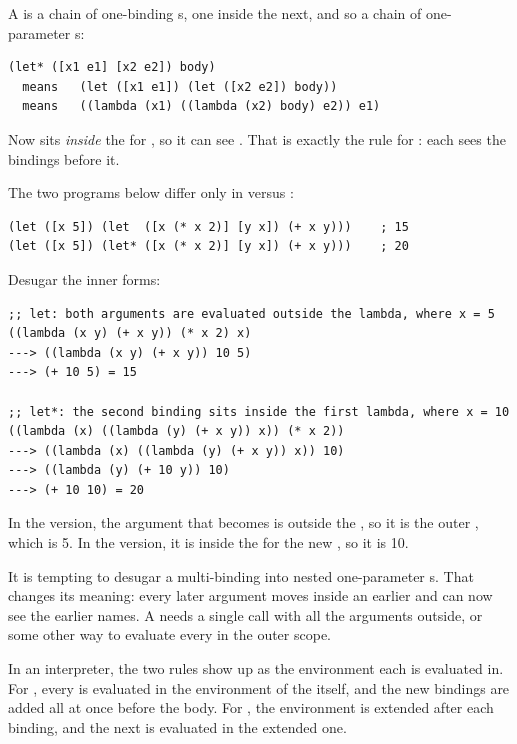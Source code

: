 A  is a chain of one-binding s, one inside the next, and so a chain of one-parameter s:
\begin{lstlisting}
(let* ([x1 e1] [x2 e2]) body)
  means   (let ([x1 e1]) (let ([x2 e2]) body))
  means   ((lambda (x1) ((lambda (x2) body) e2)) e1)
\end{lstlisting}
Now  sits \emph{inside} the  for , so it can see . That is exactly the rule for : each  sees the bindings before it.

\begin{example}
The two programs below differ only in  versus :
\begin{lstlisting}
(let ([x 5]) (let  ([x (* x 2)] [y x]) (+ x y)))    ; 15
(let ([x 5]) (let* ([x (* x 2)] [y x]) (+ x y)))    ; 20
\end{lstlisting}
Desugar the inner forms:
\begin{lstlisting}
;; let: both arguments are evaluated outside the lambda, where x = 5
((lambda (x y) (+ x y)) (* x 2) x)
---> ((lambda (x y) (+ x y)) 10 5)
---> (+ 10 5) = 15

;; let*: the second binding sits inside the first lambda, where x = 10
((lambda (x) ((lambda (y) (+ x y)) x)) (* x 2))
---> ((lambda (x) ((lambda (y) (+ x y)) x)) 10)
---> ((lambda (y) (+ 10 y)) 10)
---> (+ 10 10) = 20
\end{lstlisting}
In the  version, the argument  that becomes  is outside the , so it is the outer , which is 5. In the  version, it is inside the  for the new , so it is 10.
\end{example}

\begin{pitfall}
It is tempting to desugar a multi-binding  into nested one-parameter s. That changes its meaning: every later argument moves inside an earlier  and can now see the earlier names. A  needs a single call with all the arguments outside, or some other way to evaluate every  in the outer scope.
\end{pitfall}

In an interpreter, the two rules show up as the environment each  is evaluated in. For , every  is evaluated in the environment of the  itself, and the new bindings are added all at once before the body. For , the environment is extended after each binding, and the next  is evaluated in the extended one.


